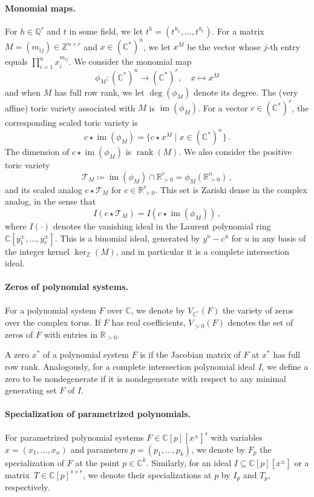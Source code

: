 \documentclass[11pt,reqno,a4paper]{amsart}
\numberwithin{equation}{section}
\theoremstyle{theoremstyle}
\theoremstyle{examplestyle}
\newcommand{\CC}{\mathbb{C}}
\newcommand{\RR}{\mathbb{R}}
\newcommand{\QQ}{\mathbb{Q}}
\newcommand{\ZZ}{\mathbb{Z}}
\DeclareMathOperator{\rank}{rank}
\DeclareMathOperator{\im}{im}
\newcommand{\term}{\bfemph}
\begin{document}
\smallskip
\paragraph{\bf Monomial maps. }
For $h\in \QQ^r$ and $t$ in some field, we let $t^h=(t^{h_1},\dots,t^{h_r})$. 
For a matrix $M=(m_{ij}) \in \ZZ^{n\times r}$ and $x\in (\CC^*)^n$, we let $x^M$ be the vector whose $j$-th entry equals $\prod_{i=1}^n x_i^{m_{ij}}$. We consider the monomial map
\[ \phi_M\colon (\CC^*)^n \rightarrow (\CC^*)^r, \quad x\mapsto x^M\] 
and when $M$ has full row rank, we let $\deg(\phi_M)$ denote its  degree.
The (very affine) toric variety associated with $M$ is   $\im(\phi_M)$. For a vector $c\in (\CC^*)^r$, the corresponding scaled toric variety is 
\[c\star\im(\phi_M)=\{ c\star x^M \mid x\in (\CC^*)^n\}\,.\]
The dimension of $c\star\im(\phi_M)$ is $\rank(M)$.
We also consider the positive toric variety 
\[\mathcal{T}_M\coloneqq\im(\phi_M)\cap\RR^r_{>0}=\phi_M(\RR^n_{>0})\,,\]
and its scaled analog $c\star\mathcal{T}_M$ for $c\in\RR^r_{>0}$.  This set is Zariski dense in the complex analog, in the sense that
\[I(c\star \mathcal{T}_M)=I(c\star\im(\phi_M))\,,\]
where $I(\cdot)$ denotes the vanishing ideal in the Laurent polynomial ring $\CC[y_1^\pm,\ldots,y_r^\pm]$. This is a binomial ideal, generated by $y^u-c^u$ for $u$ in any basis of the integer kernel $\ker_{\ZZ}(M)$, and in particular it is a complete intersection ideal.

\smallskip
\paragraph{\bf Zeros of polynomial systems. }
For a polynomial system $F$ over $\CC$, 
we denote by $V_{\CC^*}(F)$   the variety of zeros  over the complex torus. If $F$ has real coefficients,  $V_{>0}(F)$ denotes the set of zeros of $F$ with entries in $\RR_{>0}$. 

A zero $x^*$ of a polynomial system $F$ is \term{nondegenerate} if the Jacobian matrix of $F$ at $x^*$ has full row rank. Analogously, for a complete intersection polynomial ideal $I$, we define a zero to be nondegenerate if it is nondegenerate with respect to any minimal generating set $F$ of $I$. 



\smallskip
\paragraph{\bf Specialization of parametrized polynomials. }
For parametrized polynomial systems $F\in\CC[p][x^\pm]^s$
with variables $x=(x_1,\dots,x_n)$ and parameters $p=(p_1,\dots,p_k)$,  we denote by $F_p$ the specialization of $F$ at the point $p\in \CC^k$. Similarly, for an ideal $I \subseteq \mathbb{C}[p][x^\pm]$ or a matrix~$T\in \mathbb{C}[p]^{s\times r}$, we denote their specializations at $p$ by $I_p$ and $T_p$, respectively.
\end{document}
